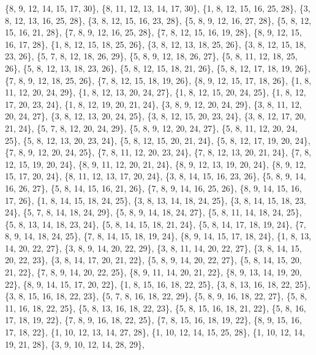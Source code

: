 \documentclass[11pt,a4paper]{article}
\begin{document}
{\{8, 9, 12, 14, 15, 17, 30\}, \{8, 11, 12, 13, 14, 17, 30\}, \{1, 8, 12, 15, 16, 25, 28\}, \{3, 8, 12, 13, 16, 25, 28\}, \{3, 8, 12, 15, 16, 23, 28\},
\{5, 8, 9, 12, 16, 27, 28\}, \{5, 8, 12, 15, 16, 21, 28\}, \{7, 8, 9, 12, 16, 25, 28\}, \{7, 8, 12, 15, 16, 19, 28\}, \{8, 9, 12, 15, 16, 17, 28\},
\{1, 8, 12, 15, 18, 25, 26\}, \{3, 8, 12, 13, 18, 25, 26\}, \{3, 8, 12, 15, 18, 23, 26\}, \{5, 7, 8, 12, 18, 26, 29\}, \{5, 8, 9, 12, 18, 26, 27\},
\{5, 8, 11, 12, 18, 25, 26\}, \{5, 8, 12, 13, 18, 23, 26\}, \{5, 8, 12, 15, 18, 21, 26\}, \{5, 8, 12, 17, 18, 19, 26\}, \{7, 8, 9, 12, 18, 25, 26\},
\{7, 8, 12, 15, 18, 19, 26\}, \{8, 9, 12, 15, 17, 18, 26\}, \{1, 8, 11, 12, 20, 24, 29\}, \{1, 8, 12, 13, 20, 24, 27\}, \{1, 8, 12, 15, 20, 24, 25\},
\{1, 8, 12, 17, 20, 23, 24\}, \{1, 8, 12, 19, 20, 21, 24\}, \{3, 8, 9, 12, 20, 24, 29\}, \{3, 8, 11, 12, 20, 24, 27\}, \{3, 8, 12, 13, 20, 24, 25\},
\{3, 8, 12, 15, 20, 23, 24\}, \{3, 8, 12, 17, 20, 21, 24\}, \{5, 7, 8, 12, 20, 24, 29\}, \{5, 8, 9, 12, 20, 24, 27\}, \{5, 8, 11, 12, 20, 24, 25\},
\{5, 8, 12, 13, 20, 23, 24\}, \{5, 8, 12, 15, 20, 21, 24\}, \{5, 8, 12, 17, 19, 20, 24\}, \{7, 8, 9, 12, 20, 24, 25\}, \{7, 8, 11, 12, 20, 23, 24\},
\{7, 8, 12, 13, 20, 21, 24\}, \{7, 8, 12, 15, 19, 20, 24\}, \{8, 9, 11, 12, 20, 21, 24\}, \{8, 9, 12, 13, 19, 20, 24\}, \{8, 9, 12, 15, 17, 20, 24\},
\{8, 11, 12, 13, 17, 20, 24\}, \{3, 8, 14, 15, 16, 23, 26\}, \{5, 8, 9, 14, 16, 26, 27\}, \{5, 8, 14, 15, 16, 21, 26\}, \{7, 8, 9, 14, 16, 25, 26\},
\{8, 9, 14, 15, 16, 17, 26\}, \{1, 8, 14, 15, 18, 24, 25\}, \{3, 8, 13, 14, 18, 24, 25\}, \{3, 8, 14, 15, 18, 23, 24\}, \{5, 7, 8, 14, 18, 24, 29\},
\{5, 8, 9, 14, 18, 24, 27\}, \{5, 8, 11, 14, 18, 24, 25\}, \{5, 8, 13, 14, 18, 23, 24\}, \{5, 8, 14, 15, 18, 21, 24\}, \{5, 8, 14, 17, 18, 19, 24\},
\{7, 8, 9, 14, 18, 24, 25\}, \{7, 8, 14, 15, 18, 19, 24\}, \{8, 9, 14, 15, 17, 18, 24\}, \{1, 8, 13, 14, 20, 22, 27\}, \{3, 8, 9, 14, 20, 22, 29\},
\{3, 8, 11, 14, 20, 22, 27\}, \{3, 8, 14, 15, 20, 22, 23\}, \{3, 8, 14, 17, 20, 21, 22\}, \{5, 8, 9, 14, 20, 22, 27\}, \{5, 8, 14, 15, 20, 21, 22\},
\{7, 8, 9, 14, 20, 22, 25\}, \{8, 9, 11, 14, 20, 21, 22\}, \{8, 9, 13, 14, 19, 20, 22\}, \{8, 9, 14, 15, 17, 20, 22\}, \{1, 8, 15, 16, 18, 22, 25\},
\{3, 8, 13, 16, 18, 22, 25\}, \{3, 8, 15, 16, 18, 22, 23\}, \{5, 7, 8, 16, 18, 22, 29\}, \{5, 8, 9, 16, 18, 22, 27\}, \{5, 8, 11, 16, 18, 22, 25\},
\{5, 8, 13, 16, 18, 22, 23\}, \{5, 8, 15, 16, 18, 21, 22\}, \{5, 8, 16, 17, 18, 19, 22\}, \{7, 8, 9, 16, 18, 22, 25\}, \{7, 8, 15, 16, 18, 19, 22\},
\{8, 9, 15, 16, 17, 18, 22\}, \{1, 10, 12, 13, 14, 27, 28\}, \{1, 10, 12, 14, 15, 25, 28\}, \{1, 10, 12, 14, 19, 21, 28\}, \{3, 9, 10, 12, 14, 28, 29\},
}
\end{document}
